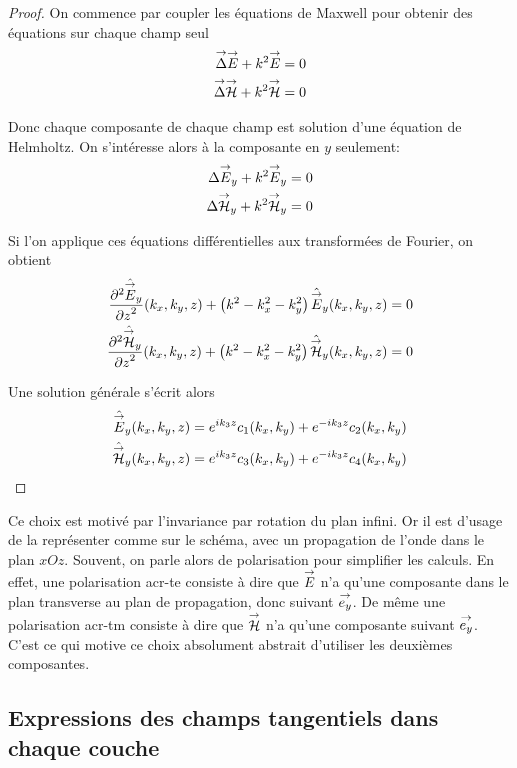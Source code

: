     \begin{proof}
        On commence par coupler les équations de Maxwell pour obtenir des équations sur chaque champ seul
        \begin{align}
            \vlapl{\vE} + k^2 \vE & = 0
            \\
            \vlapl{\vH} + k^2 \vH & = 0
        \end{align}

        Donc chaque composante de chaque champ est solution d'une équation de Helmholtz. On s’intéresse alors à la composante en \(y\) seulement:
        \begin{align}
            \lapl{\vE_y} + k^2 \vE_y & = 0
            \\
            \lapl{\vH_y} + k^2 \vH_y & = 0
        \end{align}

        Si l'on applique ces équations différentielles aux transformées de Fourier, on obtient
        \begin{align}
            \ddr[2]{z}{\hat{\vE}_y}(k_x,k_y,z) + \left( k^2 - k_x^2 - k_y^2\right) \hat{\vE}_y(k_x,k_y,z) & = 0
            \\
            \ddr[2]{z}{\hat{\vH}_y}(k_x,k_y,z) + \left( k^2 - k_x^2 - k_y^2\right) \hat{\vH}_y(k_x,k_y,z) & = 0
        \end{align}

        Une solution générale s'écrit alors
        \begin{align}
            \hat{\vE}_y(k_x,k_y,z) & = e^{ik_3z}c_1(k_x,k_y) + e^{-ik_3z}c_2(k_x,k_y)
            \\
            \hat{\vH}_y(k_x,k_y,z) & = e^{ik_3z}c_3(k_x,k_y) + e^{-ik_3z}c_4(k_x,k_y)
        \end{align}
    \end{proof}

    Ce choix est motivé par l'invariance par rotation du plan infini. Or il est d'usage de la représenter comme sur le schéma, avec un propagation de l'onde dans le plan \(xOz\). Souvent, on parle alors de polarisation pour simplifier les calculs. En effet, une polarisation \gls{acr-te} consiste à dire que \(\vE\) n'a qu'une composante dans le plan transverse au plan de propagation, donc suivant \(\vect{e_y}\). De même une polarisation \gls{acr-tm} consiste à dire que \(\vH\) n'a qu'une composante suivant \(\vect{e_y}\). C'est ce qui motive ce choix absolument abstrait d'utiliser les deuxièmes composantes.

    \subsection{Expressions des champs tangentiels dans chaque couche}

